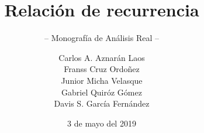 \documentclass[graybox,envcountchap,sectrefs]{svmono}
\date{3 de mayo del 2019}
\begin{document}
\author{Carlos A. Aznarán Laos\\
Franss Cruz Ordoñez\\
Junior Micha Velasque\\
Gabriel Quiróz Gómez\\
Davis S. García Fernández}
\title{Relación de recurrencia}
\subtitle{-- Monografía de Análisis Real --}
\maketitle

\frontmatter%

%



\tableofcontents

%

\mainmatter%




%



%

%


\backmatter%
%


\printindex

\end{document}
